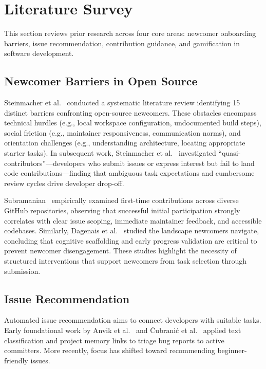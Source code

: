 \documentclass[conference]{IEEEtran}
\begin{document}
\section{Literature Survey}
This section reviews prior research across four core areas: newcomer onboarding barriers, issue recommendation, contribution guidance, and gamification in software development.

\subsection{Newcomer Barriers in Open Source}
Steinmacher et al.~\cite{steinmacher2015systematic} conducted a systematic literature review identifying 15 distinct barriers confronting open-source newcomers. These obstacles encompass technical hurdles (e.g., local workspace configuration, undocumented build steps), social friction (e.g., maintainer responsiveness, communication norms), and orientation challenges (e.g., understanding architecture, locating appropriate starter tasks). In subsequent work, Steinmacher et al.~\cite{steinmacher2018almost} investigated ``quasi-contributors''---developers who submit issues or express interest but fail to land code contributions---finding that ambiguous task expectations and cumbersome review cycles drive developer drop-off.

Subramanian~\cite{subramanian2020empirical} empirically examined first-time contributions across diverse GitHub repositories, observing that successful initial participation strongly correlates with clear issue scoping, immediate maintainer feedback, and accessible codebases. Similarly, Dagenais et al.~\cite{dagenais2010moving} studied the landscape newcomers navigate, concluding that cognitive scaffolding and early progress validation are critical to prevent newcomer disengagement. These studies highlight the necessity of structured interventions that support newcomers from task selection through submission.

\subsection{Issue Recommendation}
Automated issue recommendation aims to connect developers with suitable tasks. Early foundational work by Anvik et al.~\cite{anvik2006who} and {\v{C}}ubrani{\'c} et al.~\cite{cubranic2005hipikat} applied text classification and project memory links to triage bug reports to active committers. More recently, focus has shifted toward recommending beginner-friendly issues.
\end{document}
